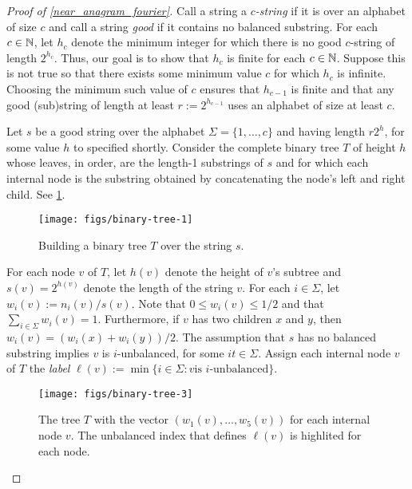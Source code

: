 \documentclass{patmorin}
\begin{document}
\begin{proof}[Proof of \cref{near_anagram_fourier}]
  Call a string a \emph{$c$-string} if it is over an alphabet of size $c$
  and call a string \emph{good} if it contains no balanced substring.
  For each $c\in\mathbb{N}$, let $h_c$ denote the minimum integer for which
  there is no good $c$-string of length $2^{h_c}$.  Thus, our goal is
  to show that $h_c$ is finite for each $c\in\mathbb{N}$.
  Suppose this is not true so that there exists some minimum value
  $c$ for which $h_c$ is infinite.  Choosing the minimum such value of
  $c$ ensures that $h_{c-1}$ is finite and that any good (sub)string of
  length at least $r:=2^{h_{c-1}}$ uses an alphabet of size at least $c$.

  Let $s$ be a good string over the alphabet $\Sigma=\{1,\ldots,c\}$ and having
  length $r2^{h}$, for some value $h$ to specified shortly.   Consider
  the complete binary tree $T$ of height $h$ whose leaves, in order,
  are the length-1 substrings of $s$ and for which each internal node is
  the substring obtained by concatenating the node's left and right child.
  See \cref{binary_tree}.

  \begin{figure}
    \begin{center}
       \texttt{[image: figs/binary-tree-1]}
    \end{center}
    \caption{Building a binary tree $T$ over the string $s$.}
    \label{binary_tree}
  \end{figure}

  For each node $v$ of $T$, let $h(v)$ denote the height of $v$'s subtree
  and $s(v)=2^{h(v)}$ denote the length of the string $v$. For each
  $i\in\Sigma$, let $w_i(v):=n_i(v)/s(v)$.  Note that $0\le w_i(v)\le
  1/2$ and that $\sum_{i\in\Sigma} w_i(v)=1$.  Furthermore, if $v$
  has two children $x$ and $y$, then $w_i(v) = (w_i(x)+w_i(y))/2$.
  The assumption that $s$ has no balanced substring implies $v$ is
  $i$-unbalanced, for some $i{t}\in\Sigma$.  Assign each internal node
  $v$ of $T$ the \emph{label} $\ell(v):=\min\{i\in\Sigma: \mbox{$v$
  is $i$-unbalanced}\}$.

  \begin{figure}
    \begin{center}
       \texttt{[image: figs/binary-tree-3]}
    \end{center}
    \caption{The tree $T$ with the vector $(w_1(v),\ldots,w_5(v))$ for each
     internal node $v$.  The unbalanced index that defines $\ell(v)$ is highlited for each node.}
    \label{binary_tree_2}
  \end{figure}


\end{proof}
\end{document}

